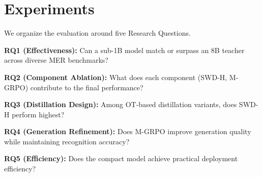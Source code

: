 \documentclass[sigconf]{acmart}
\begin{document}
\section{Experiments}

We organize the evaluation around five Research Questions.

\noindent \textbf{RQ1 (Effectiveness):} Can a sub-1B model match or surpass an 8B teacher across diverse MER benchmarks?

\noindent \textbf{RQ2 (Component Ablation):} What does each component (SWD-H, M-GRPO) contribute to the final performance?

\noindent \textbf{RQ3 (Distillation Design):} Among OT-based distillation variants, does SWD-H perform highest?

\noindent \textbf{RQ4 (Generation Refinement):} Does M-GRPO improve generation quality while maintaining recognition accuracy?

\noindent \textbf{RQ5 (Efficiency):} Does the compact model achieve practical deployment efficiency?

\begin{table}[t]
    \centering
    \small
    \setlength{\tabcolsep}{4pt}
    \renewcommand{\arraystretch}{0.9}
    \caption{Module-removal ablation. The full model corresponds to the SWD distilled student with all reported modules enabled.}
    \vspace{-1em}
    \label{tab:module_ablation}
    \vspace{-1em}
\end{table}
\end{document}
